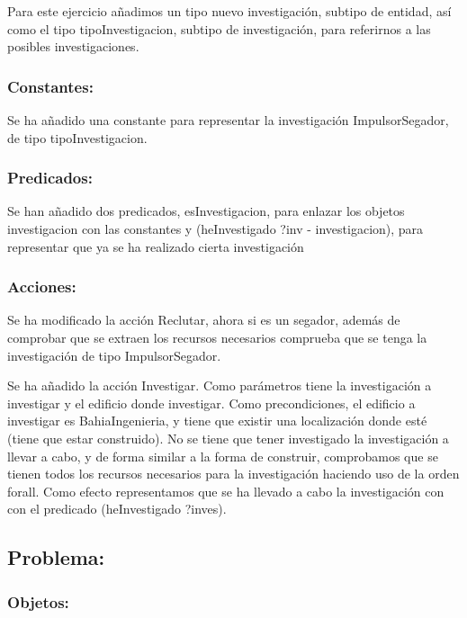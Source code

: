 \documentclass[10pt, spanish]{article}
\begin{document}
Para este ejercicio añadimos un tipo nuevo investigación, subtipo de entidad, así como el tipo tipoInvestigacion, subtipo de investigación, para referirnos a las posibles investigaciones.

\subsubsection{Constantes:}

Se ha añadido una constante para representar la investigación ImpulsorSegador, de tipo tipoInvestigacion.

\subsubsection{Predicados:}

Se han añadido dos predicados, esInvestigacion, para enlazar los objetos investigacion con las constantes y (heInvestigado ?inv - investigacion), para representar que ya se ha realizado cierta investigación

\subsubsection{Acciones:}

Se ha modificado la acción Reclutar, ahora si es un segador, además de comprobar que se extraen los recursos necesarios comprueba que se tenga la investigación de tipo ImpulsorSegador.

Se ha añadido la acción Investigar. Como parámetros tiene la investigación a investigar y el edificio donde investigar. Como precondiciones, el edificio a investigar es BahiaIngenieria,  y tiene que existir una localización donde esté (tiene que estar construido). No se tiene que tener investigado la investigación a llevar a cabo, y de forma similar a la forma de construir, comprobamos que se tienen todos los recursos necesarios para la investigación haciendo uso de la orden forall. Como efecto representamos que se ha llevado a cabo la investigación con con el predicado (heInvestigado ?inves).


\subsection{Problema:}

\subsubsection{Objetos:}
\end{document}
